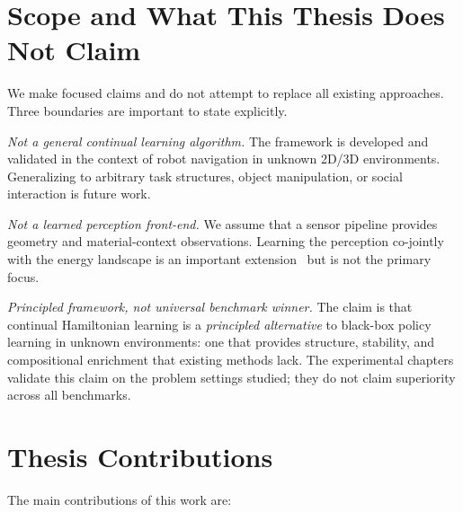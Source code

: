 \section{Scope and What This Thesis Does Not Claim}
\label{sec:intro:scope}

We make focused claims and do not attempt to replace all existing
approaches.
Three boundaries are important to state explicitly.

\emph{Not a general continual learning algorithm.}
The framework is developed and validated in the context of robot navigation
in unknown 2D/3D environments.
Generalizing to arbitrary task structures, object manipulation, or social
interaction is future work.

\emph{Not a learned perception front-end.}
We assume that a sensor pipeline provides geometry and
material-context observations.
Learning the perception co-jointly with the energy landscape is an
important extension~\citep{rosinol2020kimera} but is not the primary focus.

\emph{Principled framework, not universal benchmark winner.}
The claim is that continual Hamiltonian learning is a \emph{principled
alternative} to black-box policy learning in unknown environments: one that
provides structure, stability, and compositional enrichment that existing
methods lack.
The experimental chapters validate this claim on the problem settings studied;
they do not claim superiority across all benchmarks.

\section{Thesis Contributions}
\label{sec:intro:contributions}

The main contributions of this work are:


